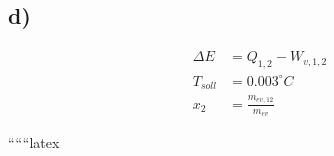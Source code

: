 

\subsection*{d)}
\begin{align*}
\Delta E &= Q_{1,2} - W_{v,1,2} \\
T_{soll} &= 0.003^\circ C \\
x_2 &= \frac{m_{ev,12}}{m_{ev}}
\end{align*}

``````latex